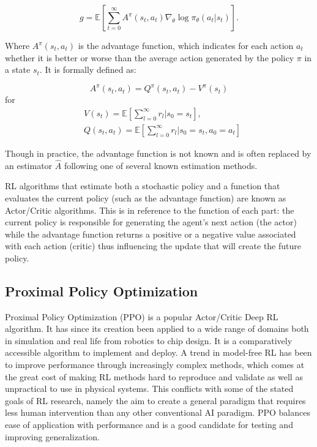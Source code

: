 \[
g = \mathbb{E}
\left[\sum^{\infty}_{t=0} A^{\pi}(s_t, a_t) \nabla_{\theta}\log\pi_{\theta}(a_t | s_t) \right].
\]


Where $A^{\pi}(s_t, a_t)$ is the advantage function, which indicates for each action $a_t$ whether it is better or worse than the average action generated by the policy $\pi$ in a state $s_t$. It is formally defined as:

\[
A^\pi(s_t,a_t) = Q^\pi(s_t, a_t) - V^\pi(s_t)
\]
for
\begin{align*}
&V(s_t) = \mathbb{E}\left[\sum_{l=0}^{\infty} r_l | s_0 = s_t \right],\\
&Q(s_t, a_t) = \mathbb{E}\left[\sum_{l=0}^{\infty} r_l | s_0 = s_t, a_0 = a_t \right]
\end{align*}

Though in practice, the advantage function is not known and is often replaced by an estimator $\hat{A}$ following one of several known estimation methods.

RL algorithms that estimate both a stochastic policy and a function that evaluates the current policy (such as the advantage function) are known as Actor/Critic algorithms. This is in reference to the function of each part: the current policy is responsible for generating the agent's next action (the actor) while the advantage function returns a positive or a negative value associated with each action (critic) thus influencing the update that will create the future policy.


\subsection{Proximal Policy Optimization}

Proximal Policy Optimization\cite{schulman2017proximal} (PPO) is a popular Actor/Critic Deep RL algorithm. It has since its creation been applied to a wide range of domains both in simulation and real life from robotics\cite{andrychowicz2020learning} to chip design\cite{mirhoseini2021graph}. It is a comparatively accessible algorithm to implement and deploy. A trend in model-free RL has been to improve performance through increasingly complex methods, which comes at the great cost of making RL methods hard to reproduce and validate as well as unpractical to use in physical systems. This conflicts with some of the stated goals of RL research, namely the aim to create a general paradigm that requires less human intervention than any other conventional AI paradigm. PPO balances ease of application with performance and is a good candidate for testing and improving generalization.

